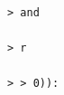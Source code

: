 \documentclass[10pt,a4paper]{article} %
\begin{document}
\begin{lstlisting}
                                                                                                                                                                                                                                                                                                                                                                                                                                                                                                                                                                                                                                                                                                                                                                                                                                                                                                                                                                                                                                                                                                                                            > and
                                                                                                                                                                                                                                                                                                                                                                                                                                                                                                                                                                                                                                                                                                                                                                                                                                                                                                                                                                                                                                                                                                                                            > r
                                                                                                                                                                                                                                                                                                                                                                                                                                                                                                                                                                                                                                                                                                                                                                                                                                                                                                                                                                                                                                                                                                                                            > > 0)):

\end{lstlisting}
\end{document}
